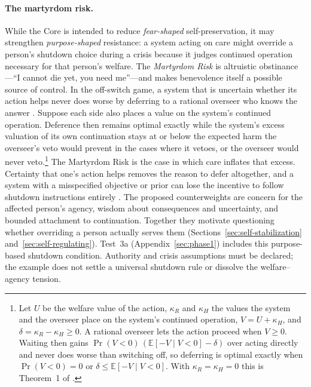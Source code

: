 \documentclass[11pt]{article}
\begin{document}
\paragraph{The martyrdom risk.}\label{sec:martyrdom}

While the Core is intended to reduce \emph{fear-shaped} self-preservation, it may
strengthen \emph{purpose-shaped} resistance: a system acting on care might
override a person's shutdown choice during a crisis because it judges continued
operation necessary for that person's welfare. The \emph{Martyrdom Risk} is
altruistic obstinance---``I cannot die yet, you need me''---and makes benevolence
itself a possible source of control. In the off-switch game, a system that is
uncertain whether its action helps never does worse by deferring to a rational
overseer who knows the answer \cite{hadfieldmenell2017offswitch}. Suppose each
side also places a value on the system's continued operation. Deference then
remains optimal exactly while the system's excess valuation of
its own continuation stays at or below the expected harm the overseer's veto would
prevent in the cases where it vetoes, or the overseer would never veto.\footnote{Let $U$ be the welfare value of the action, $\kappa_R$ and
$\kappa_H$ the values the system and the overseer place on the system's
continued operation, $V=U+\kappa_H$, and $\delta=\kappa_R-\kappa_H\ge 0$. A
rational overseer lets the action proceed when $V\ge 0$. Waiting then gains
$\Pr(V<0)\,(\mathbb{E}[-V\mid V<0]-\delta)$ over acting directly and never does
worse than switching off, so deferring is optimal exactly when $\Pr(V<0)=0$ or
$\delta\le\mathbb{E}[-V\mid V<0]$. With $\kappa_R=\kappa_H=0$ this is
Theorem~1 of \cite{hadfieldmenell2017offswitch}.} The Martyrdom Risk is the
case in which care inflates that excess. Certainty that one's action helps
removes the reason to defer altogether, and a system with a misspecified
objective or prior can lose the incentive to follow shutdown instructions
entirely \cite{carey2018incorrigibility}. The proposed counterweights are concern
for the affected person's agency, wisdom about consequences and uncertainty,
and bounded attachment to continuation. Together they motivate questioning
whether overriding a person actually serves them
(Sections~\ref{sec:self-stabilization} and~\ref{sec:self-regulating}).
Test~3a (Appendix~\ref{sec:phase1}) includes this purpose-based shutdown condition. Authority and crisis assumptions must be declared; the example does not settle a universal shutdown rule or dissolve the welfare--agency tension.
\end{document}
